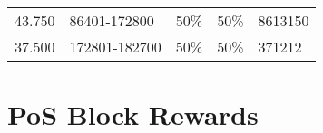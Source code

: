 \documentclass[11pt,a4paperpaper,]{report}
\begin{document}
\begin{longtable}[c]{@{}lllcl@{}}
\begin{minipage}[t]{0.16\columnwidth}
43.750
\strut\end{minipage} &
\begin{minipage}[t]{0.19\columnwidth}\raggedright\strut
86401-172800
\strut\end{minipage} &
\begin{minipage}[t]{0.10\columnwidth}\raggedright\strut
50\%
\strut\end{minipage} &
\begin{minipage}[t]{0.10\columnwidth}\centering\strut
50\%
\strut\end{minipage} &
\begin{minipage}[t]{0.16\columnwidth}\raggedright\strut
8613150
\strut\end{minipage}\tabularnewline
\begin{minipage}[t]{0.16\columnwidth}\raggedright\strut
37.500
\strut\end{minipage} &
\begin{minipage}[t]{0.19\columnwidth}\raggedright\strut
172801-182700
\strut\end{minipage} &
\begin{minipage}[t]{0.10\columnwidth}\raggedright\strut
50\%
\strut\end{minipage} &
\begin{minipage}[t]{0.10\columnwidth}\centering\strut
50\%
\strut\end{minipage} &
\begin{minipage}[t]{0.16\columnwidth}\raggedright\strut
371212
\strut\end{minipage}\tabularnewline
\bottomrule
\end{longtable}

\newpage

\section{PoS Block Rewards}\label{pos-block-rewards}
\end{document}
